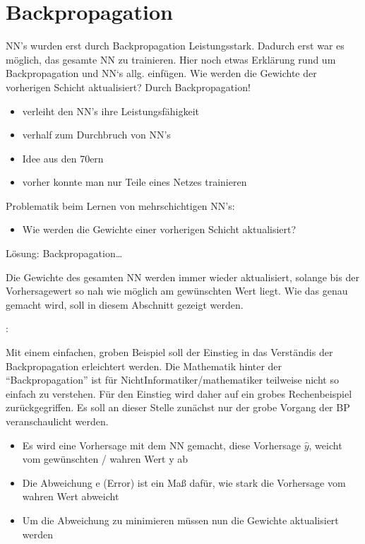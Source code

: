 \documentclass[letterpaper,10pt,english]{jupyterBook}
\begin{document}
\section{Backpropagation}
\label{\detokenize{02_NN/NN_learning:backpropagation}}
\sphinxAtStartPar
NN’s wurden erst durch Backpropagation Leistungsstark. Dadurch erst war es möglich, das gesamte NN zu trainieren.
Hier noch etwas Erklärung rund um Backpropagation und NN‘s allg. einfügen.
Wie werden die Gewichte der vorherigen Schicht aktualisiert?
Durch Backpropagation!
\begin{itemize}
\item {} 
\sphinxAtStartPar
verleiht den NN’s ihre Leistungsfähigkeit

\item {} 
\sphinxAtStartPar
verhalf zum Durchbruch von NN’s

\item {} 
\sphinxAtStartPar
Idee aus den 70ern

\item {} 
\sphinxAtStartPar
vorher konnte man nur Teile eines Netzes trainieren

\end{itemize}

\sphinxAtStartPar
Problematik beim Lernen von mehrschichtigen NN’s:
\begin{itemize}
\item {} 
\sphinxAtStartPar
Wie werden die Gewichte einer vorherigen Schicht aktualisiert?

\end{itemize}

\sphinxAtStartPar
Lösung: Backpropagation…

\sphinxAtStartPar
Die Gewichte des gesamten NN werden immer wieder aktualisiert, solange bis der Vorhersagewert so nah wie möglich am gewünschten Wert liegt. Wie das genau gemacht wird, soll in diesem Abschnitt gezeigt werden.

\sphinxAtStartPar
{}:

\sphinxAtStartPar
Mit einem einfachen, groben Beispiel soll der Einstieg in das Verständis der Backpropagation erleichtert werden. Die Mathematik hinter der “Backpropagation” ist für Nicht\sphinxhyphen{}Informatiker/\sphinxhyphen{}mathematiker teilweise nicht so einfach zu verstehen. Für den Einstieg wird daher auf ein grobes Rechenbeispiel zurückgegriffen. Es soll an dieser Stelle zunächst nur der grobe Vorgang der BP veranschaulicht werden.
\begin{itemize}
\item {} 
\sphinxAtStartPar
Es wird eine Vorhersage mit dem NN gemacht, diese Vorhersage \(\hat{y}\), weicht vom gewünschten / wahren Wert y ab

\item {} 
\sphinxAtStartPar
Die Abweichung e (Error) ist ein Maß dafür, wie stark die Vorhersage vom wahren Wert abweicht

\item {} 
\sphinxAtStartPar
Um die Abweichung zu minimieren müssen nun die Gewichte aktualisiert werden

\end{itemize}
\end{document}
